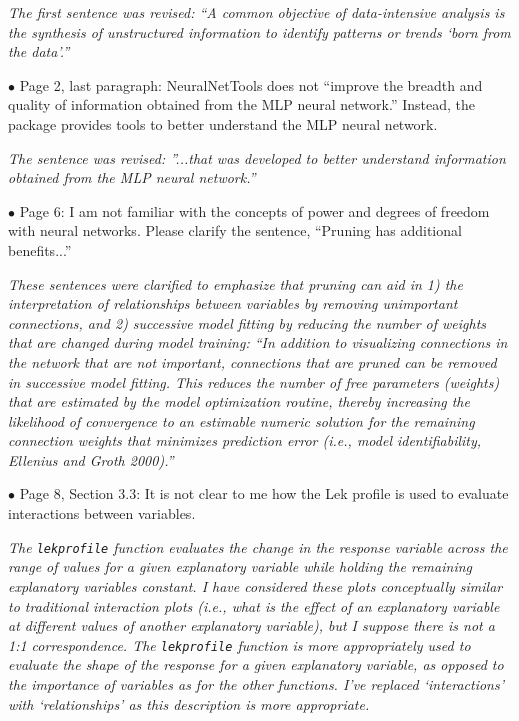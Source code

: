 \documentclass[letterpaper,12pt]{article}
\begin{document}
{\it The first sentence was revised: ``A common objective of data-intensive analysis is the synthesis of unstructured information to identify patterns or trends `born from the data'.''}

$\bullet$ Page 2, last paragraph:  NeuralNetTools does not ``improve the breadth and quality of information obtained from the MLP neural network.''  Instead, the package provides tools to better understand the MLP neural network.

{\it The sentence was revised: ''...that was developed to better understand information obtained from the MLP neural network.''}

$\bullet$ Page 6:  I am not familiar with the concepts of power and degrees of freedom with neural networks.  Please clarify the sentence, ``Pruning has additional benefits...''

{\it  These sentences were clarified to emphasize that pruning can aid in 1) the interpretation of relationships between variables by removing unimportant connections, and 2) successive model fitting by reducing the number of weights that are changed during model training: ``In addition to visualizing connections in the network that are not important, connections that are pruned can be removed in successive model fitting.  This reduces the number of free parameters (weights) that are  estimated by the model optimization routine, thereby increasing the likelihood of convergence to an estimable numeric solution for the remaining connection weights that minimizes prediction error (i.e., model identifiability, Ellenius and Groth 2000).'' }

$\bullet$ Page 8, Section 3.3:  It is not clear to me how the Lek profile is used to evaluate interactions between variables.

{\it The \texttt{lekprofile} function evaluates the change in the response variable across the range of values for a given explanatory variable while holding the remaining explanatory variables constant.  I have considered these plots conceptually similar to traditional interaction plots (i.e., what is the effect of an explanatory variable at different values of another explanatory variable), but I suppose there is not a 1:1 correspondence. The \texttt{lekprofile} function is more appropriately used to evaluate the shape of the response for a given explanatory variable, as opposed to the importance of variables as for the other functions. I've replaced `interactions' with `relationships' as this description is more appropriate.}
\end{document}
